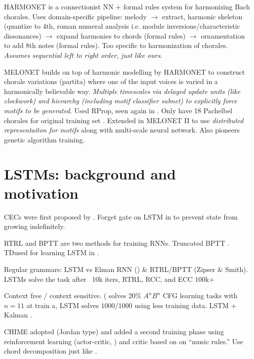 \documentclass[dissertation.tex]{subfiles}
\begin{document}
HARMONET \cite{hild1991harmonet} is a connectionist NN + formal rules system
for harmonizing Bach chorales. Uses domain-specific pipeline: melody $\to$
extract, harmonic skeleton (quantize to 4th, roman numeral analysis i.e. module
inversions/characteristic dissonances) $\to$ expand harmonies to chords (formal rules) $\to$
ornamentation to add 8th notes (formal rules). Too specific to harmonization of chorales.
\emph{Assumes sequential left to right order, just like ours}.

MELONET \cite{feulner1994melonet} builds on top of harmonic modelling by
HARMONET to construct chorale variations (partita) where one of the input
voices is varied in a harmonically believable way. \emph{Multiple timescales
via delayed update units (like clockwork) and hierarchy (including motif
classifier subnet) to explicitly force motifs to be generated}. Used
RProp\cite{riedmiller1993direct}, seen again in \cite{Liu2014}. Only have 18
Pachelbel chorales for original training set \cite{hornel1997melonet}.
Extended in MELONET II \cite{hornel1996learning} to use \emph{distributed
representaiton for motifs} along with multi-scale neural network. Also pioneers
genetic algorithm training.

\section{LSTMs: background and motivation}

CECs were first proposed by \cite{hochreiter1997long}. Forget gate on LSTM
in \cite{gers2000learning} to prevent state from growing indefinitely.

RTRL \cite{robinson1987utility} and BPTT \cite{williams1995gradient} are two
methods for training RNNs. Truncated BPTT \cite{williams1990efficient}.
TD\cite{sutton1998reinforcement}used for learning LSTM in
\cite{franklin2004predicting}.

Regular grammars: LSTM vs Elman RNN (\cite{elman1990finding}) \& RTRL/BPTT (Zipser \& Smith).
LSTMs solve the task after ~10k iters, RTRL, RCC, and ECC 100k+

Context free / context sensitive. (\cite{wiles1995learning} solves $20\%$ $A^n
B^n$ CFG learning tasks with $n = 11$ at train a, LSTM\cite{gers2001lstm}
solves $1000/1000$ using less training data. LSTM + Kalman \cite{gers2002dekf}.

CHIME \cite{franklin2001learning} adopted \cite{todd1989connectionist} (Jordan type) and
added a second training phase using reinforcement learning (actor-critic, \cite{sutton1998reinforcement})
and critic based on on ``music rules.'' Use chord decomposition just
like \cite{Eck2002}.
\end{document}
